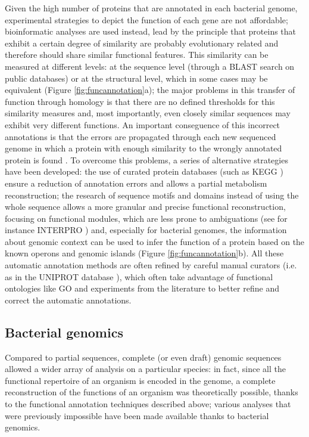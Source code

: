 Given the high number of proteins that are annotated in each bacterial genome, experimental strategies to depict the function of each gene are not affordable; bioinformatic analyses are used instead, lead by the principle that proteins that exhibit a certain degree of similarity are probably evolutionary related and therefore should share similar functional features. This similarity can be measured at different levels: at the sequence level (through a BLAST \cite{camacho2009blast+} search on public databases) or at the structural level, which in some cases may be equivalent (Figure \ref{fig:funcannotation}a); the major problems in this transfer of function through homology is that there are no defined thresholds for this similarity measures and, most importantly, even closely similar sequences may exhibit very different functions. An important conseguence of this incorrect annotations is that the errors are propagated through each new sequenced genome in which a protein with enough similarity to the wrongly annotated protein is found \cite{whisstock2003prediction} \cite{sleator2010overview}. To overcome this problems, a series of alternative strategies have been developed: the use of curated protein databases (such as KEGG \cite{ogata1999kegg}) ensure a reduction of annotation errors and allows a partial metabolism reconstruction; the research of sequence motifs and domains instead of using the whole sequence allows a more granular and precise functional reconstruction, focusing on functional modules, which are less prone to ambiguations (see for instance INTERPRO \cite{apweiler2001interpro}\cite{zdobnov2001interproscan}) and, especially for bacterial genomes, the information about genomic context can be used to infer the function of a protein based on the known operons and genomic islands \cite{sleator2010overview} (Figure \ref{fig:funcannotation}b). All these automatic annotation methods are often refined by careful manual curators (i.e. as in the UNIPROT database \cite{uniprot2008universal}), which often take advantage of functional ontologies like GO \cite{ashburner2000gene} and experiments from the literature to better refine and correct the automatic annotations.


\subsection{Bacterial genomics}
\label{sec:genemining}
Compared to partial sequences, complete (or even draft) genomic sequences allowed a wider array of analysis on a particular species: in fact, since all the functional repertoire of an organism is encoded in the genome, a complete reconstruction of the functions of an organism was theoretically possible, thanks to the functional annotation techniques described above; various analyses that were previously impossible have been made available thanks to bacterial genomics.

